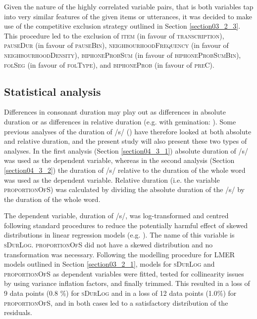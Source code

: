 Given the nature of the highly correlated variable pairs, that is both variables tap into very similar features of the given items or utterances, it was decided to make use of the competitive exclusion strategy outlined in Section \ref{section03_2_3}. This procedure led to the exclusion of \textsc{item} (in favour of \textsc{transcription}), \textsc{pauseDur} (in favour of \textsc{pauseBin}), \textsc{neighbourhoodFrequency} (in favour of \textsc{neighbourhoodDensity}), \textsc{biphoneProbSum} (in favour of \textsc{biphoneProbSumBin}), \textsc{folSeg} (in favour of \textsc{folType}), and \textsc{biphoneProb} (in favour of \textsc{preC}).

\subsection{Statistical analysis}\label{section04_2_4}

Differences in consonant duration may play out as differences in absolute duration or as differences in relative duration (e.g. with gemination: \cite{Oh2012, Ridouane2017, BenHedia2019}). Some previous analyses of the duration of /s/ (\cite{Plag2017}) have therefore looked at both absolute and relative duration, and the present study will also present these two types of analyses. In the first analysis (Section \ref{section04_3_1}) absolute duration of /s/ was used as the dependent variable, whereas in the second analysis (Section \ref{section04_3_2}) the duration of /s/ relative to the duration of the whole word was used as the dependent variable. Relative duration (i.e. the variable \textsc{proportionOfS}) was calculated by dividing the absolute duration of the /s/ by the duration of the whole word. 

The dependent variable, duration of /s/, was log-transformed and centred following standard procedures to reduce the potentially harmful effect of skewed distributions in linear regression models (e.g. \cite{Winter2019}). The name of this variable is \textsc{sDurLog}. \textsc{proportionOfS} did not have a skewed distribution and no transformation was necessary. Following the modelling procedure for LMER models outlined in Section \ref{section03_2_1}, models for \textsc{sDurLog} and \textsc{proportionOfS} as dependent variables were fitted, tested for collinearity issues by using variance inflation factors, and finally trimmed. This resulted in a loss of 9 data points (0.8 \%) for \textsc{sDurLog} and in a loss of 12 data points (1.0\%) for \textsc{proportionOfS}, and in both cases led to a satisfactory distribution of the residuals.

